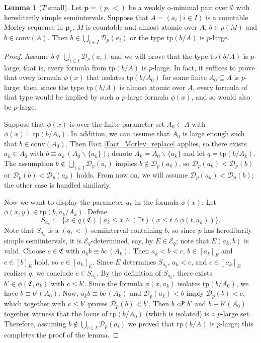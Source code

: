 \documentclass{amsart}
\theoremstyle{definition}
\newtheorem{Lemma}[Theorem]{Lemma}
\theoremstyle{definition}
\newcommand{\Mon}{\mathfrak C}
\newcommand{\tp}{\mathrm{tp}}
\newcommand{\conv}{\mathrm{conv}}
\def\pp{\mathbf{p}}
\begin{document}
\begin{Lemma}[$T$ small]\label{Lemma_alatomic_plarge} 
Let $\mathbf p=(p,<)$ be a weakly o-minimal pair over $\emptyset$ with hereditarily simple semiintervals. Suppose that $A=(a_i\mid i\in I)$ is a countable Morley sequence in $\mathbf p_r$, $M$ is countable and almost atomic over $A$, $b\in p(M)$  and $b\in\conv(A)$. Then $b\in \bigcup_{i\in I}\mathcal D_p(a_i)$ or the type $\tp(b/A)$ is $p$-large. 
\end{Lemma}
\begin{proof} Assume  $b\notin \bigcup_{i\in I}\mathcal D_p(a_i)$ and we will prove that the type $\tp(b/A)$ is $p$-large, that is, 
 every formula from $\tp(b/A)$ is $p$-large. In fact,  
it suffices to prove that every formula $\phi(x)$ that isolates $\tp(b/A_0)$ for some finite $A_0\subseteq A$ is $p$-large; then, since the type $\tp(b/A)$ is almost atomic over $A$, every formula of that type would be implied by such a $p$-large formula $\phi(x)$, and so would also be $p$-large. 

Suppose that $\phi(x)$ is over the finite parameter set $A_0\subset A$  with $\phi(x)\vdash \tp(b/A_0)$. In addition, we can assume that $A_0$ is large enough such that $b\in \conv (A_0)$. Then Fact \ref{Fact_Morley_replace} applies, so there exists $a_k\in A_0$ with $b\equiv a_k\,(A_0\smallsetminus \{a_k\})$;  denote $A_k=A_0\smallsetminus \{a_k\}$ and let $q=\tp(b/A_k)$. The assumption $b\notin \bigcup_{i\in I}\mathcal D_p(a_i)$ implies $b\notin \mathcal D_p(a_k)$, so $\mathcal D_p(a_k)<\mathcal D_p(b)$ or $\mathcal D_p(b)<\mathcal D_p (a_k )$ holds. From now on, we will assume $\mathcal D_p(a_k)<\mathcal D_p(b)$; the other case is handled similarly.

Now we want to display the parameter $a_k$  in the formula $\phi(x)$: Let $\phi(x,y)\in \tp(b,a_k/A_k)$. Define $$S_{a_k}:=\{x\in q(\Mon)\mid a_k\leqslant x\land (\exists t)(x\leqslant t\land \phi(t,a_k))\}.$$
Note that $S_{a_k}$ is a $(q,<)$-semiinterval containing $b$, so since $p$ has hereditarily simple semiintervals, it is $\mathcal E_q$-determined, say, by $E\in \mathcal E_q$; note that $E(a_k,b)$ is valid. 
Choose $c\in \Mon$ with $a_kb\equiv bc\,(A_k)$. Then $a_k<b<c$, $b\in [a_k]_E$ and $c\in[b]_E$ hold, so $c\in[a_k]_E$. Since $E$ determines $S_{a_k}$, $a_k<c$, and $c\in[a_k]_E$ realizes $q$, we conclude $c\in S_{a_k}$. 
By the definition of $S_{a_k}$, there exists $b'\in\phi(\Mon,a_k)$ with $c\leqslant b'$. Since the formula $\phi(x,a_k)$ isolates $\tp(b/A_0)$, we have $b\equiv b'(A_0)$. Now, $a_kb\equiv bc\,(A_k)$ and $\mathcal D_p(a_k)<b$  imply $\mathcal D_p(b)<c$, which together with $c\leqslant b'$ proves $\mathcal D_p(b)<b'$. Then $b\triangleleft^\pp b'$ and $b\equiv b'(A_0)$ together witness that the locus of $\tp(b/A_0)$ (which is isolated) is a $p$-large set. Therefore, assuming $b\notin \bigcup_{i\in I}\mathcal D_p(a_i)$ we proved that $\tp(b/A)$ is $p$-large; this completes the proof of the lemma. 
\end{proof} 
\end{document}
